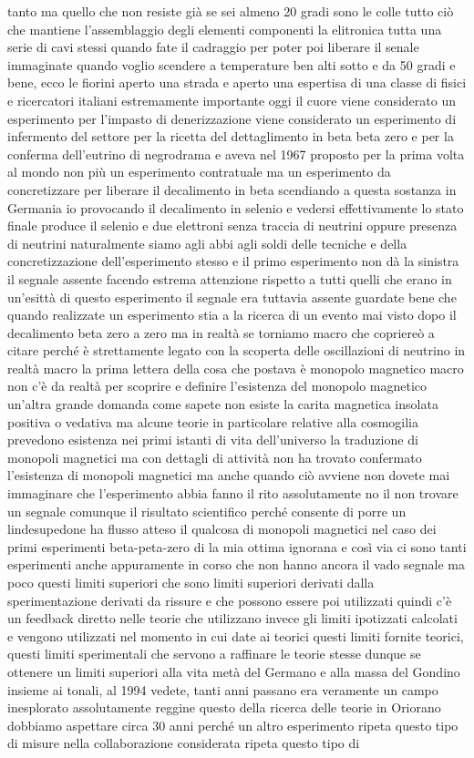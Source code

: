 tanto ma quello che non resiste già se sei almeno 20 gradi sono le colle tutto ciò che mantiene l'assemblaggio degli elementi componenti la elitronica tutta una serie di cavi stessi quando fate il cadraggio per poter poi liberare il senale immaginate quando voglio scendere a temperature ben alti sotto e da 50 gradi e bene, ecco le fiorini aperto una strada e aperto una espertisa di una classe di fisici e ricercatori italiani estremamente importante oggi il cuore viene considerato un esperimento per l'impasto di denerizzazione viene considerato un esperimento di infermento del settore per la ricetta del dettaglimento in beta beta zero e per la conferma dell'eutrino di negrodrama e aveva nel 1967 proposto per la prima volta al mondo non più un esperimento contratuale ma un esperimento da concretizzare per liberare il decalimento in beta scendiando a questa sostanza in Germania io provocando il decalimento in selenio e vedersi effettivamente lo stato finale produce il selenio e due elettroni senza traccia di neutrini oppure presenza di neutrini naturalmente siamo agli abbi agli soldi delle tecniche e della concretizzazione dell'esperimento stesso e il primo esperimento non dà la sinistra il segnale assente facendo estrema attenzione rispetto a tutti quelli che erano in un'esittà di questo esperimento il segnale era tuttavia assente guardate bene che quando realizzate un esperimento stia a la ricerca di un evento mai visto dopo il decalimento beta zero a zero ma in realtà se torniamo macro che copriereò a citare perché è strettamente legato con la scoperta delle oscillazioni di neutrino in realtà macro la prima lettera della cosa che postava è monopolo magnetico macro non c'è da realtà per scoprire e definire l'esistenza del monopolo magnetico un'altra grande domanda come sapete non esiste la carita magnetica insolata positiva o vedativa ma alcune teorie in particolare relative alla cosmogilia prevedono esistenza nei primi istanti di vita dell'universo la traduzione di monopoli magnetici ma con dettagli di attività non ha trovato confermato l'esistenza di monopoli magnetici ma anche quando ciò avviene non dovete mai immaginare che l'esperimento abbia fanno il rito assolutamente no il non trovare un segnale comunque il risultato scientifico perché consente di porre un lindesupedone ha flusso atteso il qualcosa di monopoli magnetici nel caso dei primi esperimenti beta-peta-zero di la mia ottima ignorana e così via ci sono tanti esperimenti anche appuramente in corso che non hanno ancora il vado segnale ma poco questi limiti superiori che sono limiti superiori derivati dalla sperimentazione derivati da rissure e che possono essere poi utilizzati quindi c'è un feedback diretto nelle teorie che utilizzano invece gli limiti ipotizzati calcolati e vengono utilizzati nel momento in cui date ai teorici questi limiti fornite teorici, questi limiti sperimentali che servono a raffinare le teorie stesse dunque se ottenere un limiti superiori alla vita metà del Germano e alla massa del Gondino insieme ai tonali, al 1994 vedete, tanti anni passano era veramente un campo inesplorato assolutamente reggine questo della ricerca delle teorie in Oriorano dobbiamo aspettare circa 30 anni perché un altro esperimento ripeta questo tipo di misure nella collaborazione considerata ripeta questo tipo di 